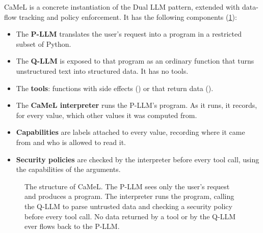 CaMeL is a concrete instantiation of the Dual LLM pattern, extended with
data-flow tracking and policy enforcement.
It has the following components (\cref{fig:camel:arch}):
\begin{itemize}
  \item The \textbf{P-LLM} translates the user's request into a program
    in a restricted subset of Python.
  \item The \textbf{Q-LLM} is exposed to that program as an ordinary
    function that turns unstructured text into structured data. It has
    no tools.
  \item The \textbf{tools}: functions with side effects
    () or that return data ().
  \item The \textbf{CaMeL interpreter} runs the P-LLM's program. As it
    runs, it records, for every value, which other values it was computed
    from.
  \item \textbf{Capabilities} are labels attached to every value,
    recording where it came from and who is allowed to read it.
  \item \textbf{Security policies} are checked by the interpreter
    before every tool call, using the capabilities of the arguments.
\end{itemize}

\begin{figure}
\centering
{}
\caption{The structure of CaMeL. The P-LLM sees only the user's request
and produces a program. The interpreter runs the program, calling the
Q-LLM to parse untrusted data and checking a security policy before every
tool call. No data returned by a tool or by the Q-LLM ever flows back to
the P-LLM.}
\label{fig:camel:arch}
\end{figure}

